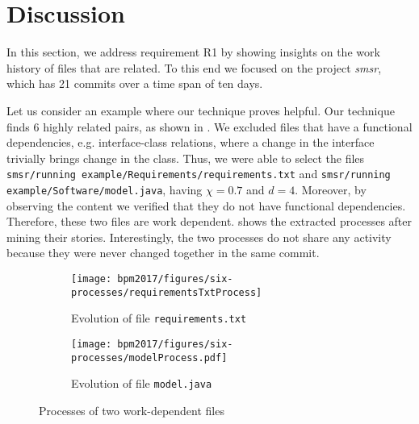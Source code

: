 \section{Discussion}
\label{subsec:qualitative-eval}

In this section, we address requirement R1 by showing insights on the work history of files that are related. To this end we focused on the project \emph{smsr}, which has 21 commits over a time span of ten days.

Let us consider an example where our technique proves helpful. Our technique finds 6 highly related pairs, as shown in . We excluded files that have a functional dependencies, e.g. interface-class relations, where a change in the interface trivially brings change in the class. Thus, we were able to select the files \texttt{smsr/running example/Requirements/requirements.txt} and \texttt{smsr/running example/Software/model.java}, having $\chi=0.7$ and $d=4$. Moreover, by observing the content we verified that they do not have functional dependencies. Therefore, these two files are work dependent.
 shows the extracted processes after mining their stories. Interestingly, the two processes do not share any activity because they were never changed together in the same commit.

\begin{figure}[t]
	\begin{subfigure}[t]{\textwidth}
		\centering
		\texttt{[image: bpm2017/figures/six-processes/requirementsTxtProcess]}
		\caption{Evolution of file \texttt{requirements.txt}}
		\label{subfig:requirements-file-process}
	\end{subfigure}
	\begin{subfigure}[ht]{\textwidth}
		\centering
		\texttt{[image: bpm2017/figures/six-processes/modelProcess.pdf]}
		\caption{Evolution of file \texttt{model.java}}
		\label{subfig:model-file-process}
	\end{subfigure}
	\caption{Processes of two work-dependent files}
	\label{fig:evaluated-processes}
\end{figure}

